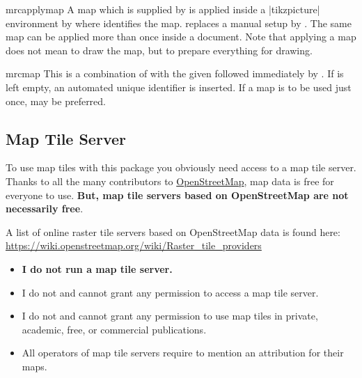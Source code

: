 \begin{docCommand}{mrcapplymap}{}
  A map which is supplied by  is applied
  inside a |tikzpicture| environment by
   where  identifies the map.
   replaces a manual setup by .
  The same map can be applied more than once inside a document.
  Note that applying a map does not mean to draw the map, but to prepare
  everything for drawing.
\end{docCommand}


\begin{docCommand}{mrcmap}{}
  This is a combination of
   with the given 
  followed immediately by .
  If  is left empty, an automated unique identifier is
  inserted.
  If a map is to be used just once,  may be preferred.
\end{docCommand}





\clearpage
\subsection{Map Tile Server}\label{sec:maptileserver}


To use map tiles with this package you obviously need access to a map tile server.
Thanks to all the many contributors to
\href{https://openstreetmap.org/copyright}{OpenStreetMap},
map data is free for everyone to use.
\textbf{But, map tile servers based on OpenStreetMap are not necessarily free}.

A list of online raster tile servers based on OpenStreetMap data is found here:\\
\url{https://wiki.openstreetmap.org/wiki/Raster_tile_providers}

\begin{itemize}
\item\bfseries I do not run a map tile server.
\item I do not and cannot grant any permission to access a map tile server.
\item I do not and cannot grant any permission to use map tiles in
  private, academic, free, or commercial publications.
\item All operators of map tile servers require to mention an attribution
  for their maps.
\end{itemize}

